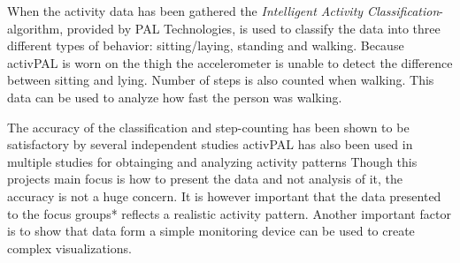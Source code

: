 When the activity data has been gathered the \emph{Intelligent Activity Classification}-algorithm, provided by PAL Technologies, is used to classify the data into three different types of behavior: sitting/laying, standing and walking. Because activPAL is worn on the thigh the accelerometer is unable to detect the difference between sitting and lying. Number of steps is also counted when walking. This data can be used to analyze how fast the person was walking.

The accuracy of the classification and step-counting has been shown to be satisfactory by several independent studies %
activPAL has also been used in multiple studies for obtainging and analyzing activity patterns %
Though this projects main focus is how to present the data and not analysis of it, the accuracy is not a huge concern. It is however important that the data presented to the focus groups* reflects a realistic activity pattern. Another important factor is to show that data form a simple monitoring device can be used to create complex visualizations.
